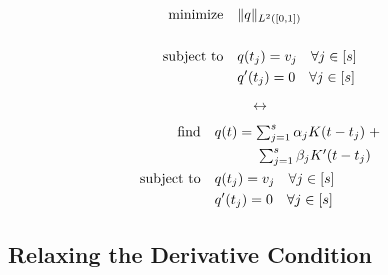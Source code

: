 \documentclass[11pt]{article}
\newcommand{\hs}{\hspace{1mm}}
\newcommand{\HS}{\hspace{3.5mm}}
\begin{document}
\noindent
\begin{minipage}{.48\linewidth}
    \vspace{0.7cm}
    \begin{equation*}
\begin{aligned}
  \text{minimize} &\HS \|q\|_{L^2([0, 1])} \\ \\
  \text{subject to} &\HS q(t_j) = v_j \HS \forall j \in [s] \\
                  &\HS q^\prime(t_j) = 0 \HS \forall j \in [s]
              \end{aligned}
          \end{equation*}
\end{minipage}
\begin{minipage}{.04\linewidth}
    \[ \leftrightarrow \]
\end{minipage}
\begin{minipage}{.48\linewidth}
    \begin{equation}
\begin{aligned}
  \text{find} &\HS q(t) = \textstyle\sum_{j = 1}^s \alpha_jK(t - t_j) \hs + \\
  &\HS\HS\HS\HS \textstyle\sum_{j = 1}^s\beta_jK^\prime(t - t_j) \\
  \text{subject to} &\HS q(t_j) = v_j \HS \forall j \in [s] \\
                  &\HS q^\prime(t_j) = 0 \HS \forall j \in [s]
              \end{aligned}
          \end{equation}
\end{minipage}
\vspace{1em}

\subsection{Relaxing the Derivative Condition}
\end{document}
